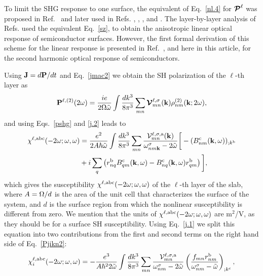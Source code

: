 \documentclass[floatfix,prb,aps,superscriptaddress,11pt,preprint,letterpaper]{revtex4}
\begin{document}
To limit the SHG response to one surface, the equivalent of Eq.~\eqref{nl.4} 
for $\boldsymbol{\mathcal{\cal P}}^\ell$ was proposed in 
Ref.~ and later used in Refs.
,
,
,
 and . 
The layer-by-layer analysis of Refs.  
used the equivalent Eq.~\eqref{sz}, 
to obtain the
anisotropic linear optical response of semiconductor surfaces.
However, the first formal derivation
of this scheme 
for the linear response 
is presented in
Ref.~, 
and here in this 
article, for the second harmonic optical response of semiconductors.

Using
$\mathbf{J}=d\mathbf{P}/dt$ 
and Eq.~\eqref{jmac2} 
we obtain the SH polarization of the $\ell$-th layer as
\begin{equation}\label{Pjikn}
\mathbf{P}^{\ell,(2)}(2\omega)
=\frac{ie}{2\Omega\tilde\omega}
\int \frac{dk^3}{8\pi^3}
\sum_{mn}
\boldsymbol{\mathcal{\cal V}}^{\ell,\sigma}_{mn}(\mathbf{k})
\rho^{(2)}_{nm}(\mathbf{k};2\omega)
,
\end{equation}
and using Eqs.~\eqref{pshg} and \eqref{j.2} 
leads to
\begin{align}\label{Pjikn2}
\chi^{\ell,\mathrm{a}\mathrm{b}\mathrm{c}}(-2\omega;\omega,\omega) 
&=
\frac{e^2}{2A\hbar\tilde\omega}
\int \frac{dk^3}{8\pi^3}
\sum_{mn}
\frac{{\mathbf{\cal V}}^{\ell,\sigma,\mathrm{a}}_{mn}(\mathbf{k})}
{\omega^\sigma_{nm\mathbf{k}}-2\tilde\omega}
\bigg[
-(B_{nm}^{\mathrm{c}}(\mathbf{k},\omega))_{;k^{\mathrm{b}}}
\nonumber \\
&
+i\sum_q\left(r_{nq}^{\mathrm{b}}B_{qm}^{\mathrm{c}}(\mathbf{k},\omega) -
  B_{nq}^{\mathrm{c}}(\mathbf{k},\omega) 
  r_{qm}^{\mathrm{b}}\right)
\bigg]
,
\end{align}
which gives the susceptibility 
$\chi^{\ell,\mathrm{a}\mathrm{b}\mathrm{c}}(-2\omega;\omega,\omega)$ 
of the $\ell$-th layer of the slab, 
where $A=\Omega/d$ is the area of the unit
cell that characterizes the surface of the system, and $d$
is the surface region {\color{red} from} which the {\color{red} nonlinear} 
susceptibility is different from zero.
We mention that the units of 
$\chi^{\ell,\mathrm{a}\mathrm{b}\mathrm{c}}(-2\omega;\omega,\omega)$
are m$^2$/V, as they {\color{red} should be} for a surface SH susceptibility.
Using Eq.~\eqref{j.1} we
split this equation into
two contributions from the first and second terms on the right hand side
{\color{red} of Eq.~\eqref{Pjikn2}:}
\begin{equation}\label{chii}
\chi^{\ell,\mathrm{a}\mathrm{b}\mathrm{c}}_i (-2\omega;\omega,\omega)
=-\frac{e^3}{A\hbar^22\tilde\omega}
\int \frac{dk^3}{8\pi^3}
\sum_{mn}
\frac{{\mathbf{\cal V}}_{mn}^{\ell,\sigma,\mathrm{a}}}{\omega^\sigma_{nm}-2\tilde\omega}
\left(\frac{f_{mn}r_{nm}^{\mathrm{b}}}{\omega^\sigma_{nm}-\tilde\omega}\right)_{;k^{\mathrm{c}}}
,
\end{equation} 
\end{document}
